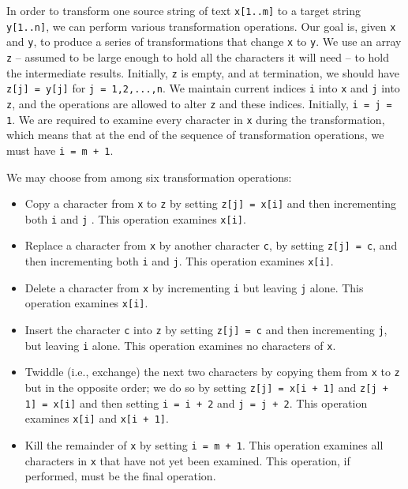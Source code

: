 In order to transform one source string of text \verb!x[1..m]!
to a target string \verb!y[1..n]!,
we can perform various transformation operations.
Our goal is, given \verb!x! and \verb!y!,
to produce a series of transformations that change \verb!x! to \verb!y!.
We use an array \verb!z!
-- assumed to be large enough to hold all the characters it will need -- to hold
the intermediate results.
Initially, \verb!z! is empty, and at termination, we should have
\verb!z[j] = y[j]! for \verb!j = 1,2,...,n!.
We maintain current indices \verb!i! into \verb!x! and \verb!j! into \verb!z!,
and the operations are allowed to alter \verb!z! and these indices.
Initially, \verb!i = j = 1!.
We are required to examine every character in \verb!x! during the transformation, which
means that at the end of the sequence of transformation operations, we must have
\verb!i = m + 1!.

We may choose from among six transformation operations:

\begin{itemize}
  
\item
  Copy a character from \verb!x! to \verb!z! by setting \verb!z[j] = x[i]! and then incrementing both \verb!i!
  and \verb!j! . This operation examines \verb!x[i]!.

\item
  Replace a character from \verb!x! by another character \verb!c!, by setting \verb!z[j] = c!,
  and then
  incrementing both \verb!i! and \verb!j!.
  This operation examines \verb!x[i]!.

  \item
    Delete a character from \verb!x! by incrementing \verb!i! but leaving \verb!j! alone.
    This operation
    examines \verb!x[i]!.

  \item
    Insert the character \verb!c! into \verb!z! by setting \verb!z[j] = c! and then incrementing \verb!j!, but
    leaving \verb!i! alone.
    This operation examines no characters of \verb!x!.

  \item
    Twiddle (i.e., exchange) the next two characters by copying them from \verb!x! to \verb!z! but
    in the opposite order; we do so by setting \verb!z[j] = x[i + 1]! and \verb!z[j + 1] = x[i]!
    and then setting \verb!i = i + 2! and \verb!j = j + 2!. This operation examines \verb!x[i]! 
    and \verb!x[i + 1]!.

  \item
    Kill the remainder of \verb!x! by setting \verb!i = m + 1!.
    This operation examines all characters
    in \verb!x! that have not yet been examined.
    This operation, if performed, must
    be the final operation.
  \end{itemize}

